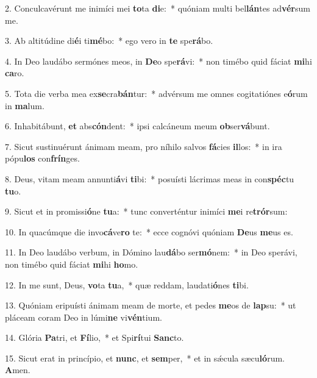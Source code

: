 2. Conculcavérunt me inimíci mei \textbf{to}ta \textbf{di}e:~*  quóniam multi bel\textbf{lán}tes ad\textbf{vér}sum me.\

3. Ab altitúdine di\textbf{é}i ti\textbf{mé}bo:~*  ego vero in \textbf{te} spe\textbf{rá}bo.\

4. In Deo laudábo sermónes meos, in \textbf{De}o spe\textbf{rá}vi:~*  non timébo quid fáciat \textbf{mi}hi \textbf{ca}ro.\

5. Tota die verba mea ex\textbf{se}cra\textbf{bán}tur:~*  advérsum me omnes cogitatiónes e\textbf{ó}rum in \textbf{ma}lum.\

6. Inhabitábunt, \textbf{et} abs\textbf{cón}dent:~*  ipsi calcáneum meum \textbf{ob}ser\textbf{vá}bunt.\

7. Sicut sustinuérunt ánimam meam, pro níhilo salvos \textbf{fá}cies \textbf{il}los:~*  in ira pópu\textbf{los} con\textbf{frín}ges.\

8. Deus, vitam meam annunti\textbf{á}vi \textbf{ti}bi:~*  posuísti lácrimas meas in con\textbf{spéc}tu \textbf{tu}o.\

9. Sicut et in promissi\textbf{ó}ne \textbf{tu}a:~*  tunc converténtur inimíci \textbf{me}i re\textbf{trór}sum:\

10. In quacúmque die invo\textbf{cá}ve\textbf{ro} te:~*  ecce cognóvi quóniam \textbf{De}us \textbf{me}us es.\

11. In Deo laudábo verbum, in Dómino lau\textbf{dá}bo ser\textbf{mó}nem:~*  in Deo sperávi, non timébo quid fáciat \textbf{mi}hi \textbf{ho}mo.\

12. In me sunt, Deus, \textbf{vo}ta \textbf{tu}a,~*  quæ reddam, laudati\textbf{ó}nes \textbf{ti}bi.\

13. Quóniam eripuísti ánimam meam de morte, et pedes \textbf{me}os de \textbf{lap}su:~*  ut pláceam coram Deo in lúmi\textbf{ne} vi\textbf{vén}tium.\

14. Glória \textbf{Pa}tri, et \textbf{Fí}lio,~*  et Spi\textbf{rí}tui \textbf{Sanc}to.\

15. Sicut erat in princípio, et \textbf{nunc}, et \textbf{sem}per,~*  et in sǽcula sæcu\textbf{ló}rum. \textbf{A}men.\

